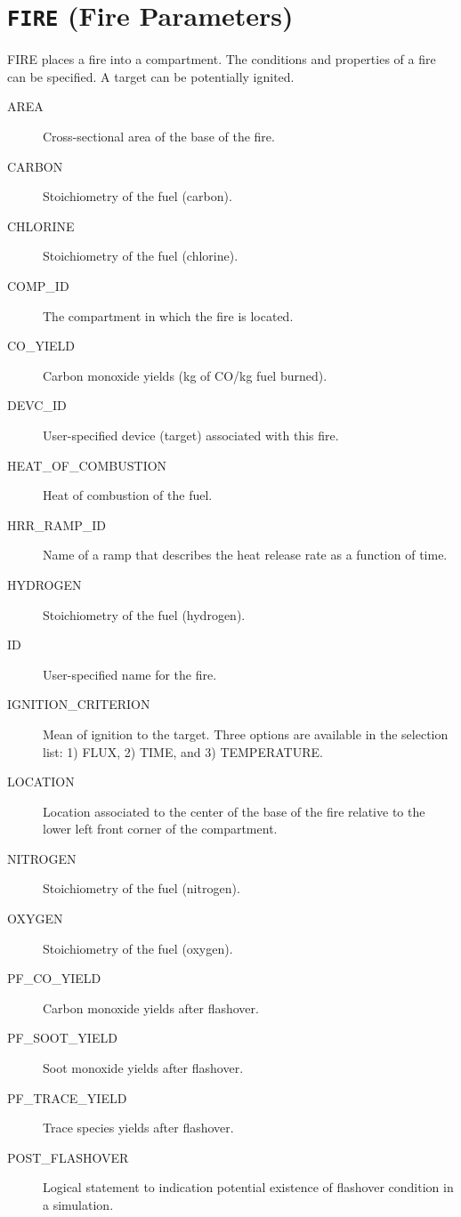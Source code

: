 \vspace{\baselineskip}


\section{\texorpdfstring{{\tt FIRE}}{FIRE} (Fire Parameters)}

FIRE places a fire into a compartment. The conditions and properties of a fire can be specified. A target can be potentially ignited.

\begin{adjustwidth}{1cm}{0cm}
\begin{description}
  \item[AREA] Cross-sectional area of the base of the fire.
  \item[CARBON] Stoichiometry of the fuel (carbon).
  \item[CHLORINE] Stoichiometry of the fuel (chlorine).
  \item[COMP\_ID] The compartment in which the fire is located.
  \item[CO\_YIELD] Carbon monoxide yields (kg of CO/kg fuel burned).
  \item[DEVC\_ID] User-specified device (target) associated with this fire.
  \item[HEAT\_OF\_COMBUSTION] Heat of combustion of the fuel.
  \item[HRR\_RAMP\_ID] Name of a ramp that describes the heat release rate as a function of time.
  \item[HYDROGEN] Stoichiometry of the fuel (hydrogen).
  \item[ID] User-specified name for the fire.
  \item[IGNITION\_CRITERION] Mean of ignition to the target. Three options are available in the selection list: 1) FLUX, 2) TIME, and 3) TEMPERATURE. 
  \item[LOCATION] Location associated to the center of the base of the fire relative to the lower left front corner of the compartment.
  \item[NITROGEN] Stoichiometry of the fuel (nitrogen).
  \item[OXYGEN] Stoichiometry of the fuel (oxygen).
  \item[PF\_CO\_YIELD] Carbon monoxide yields after flashover.
  \item[PF\_SOOT\_YIELD] Soot monoxide yields after flashover.
  \item[PF\_TRACE\_YIELD] Trace species yields after flashover.
  \item[POST\_FLASHOVER] Logical statement to indication potential existence of flashover condition in a simulation.

\end{description}
\end{adjustwidth}
